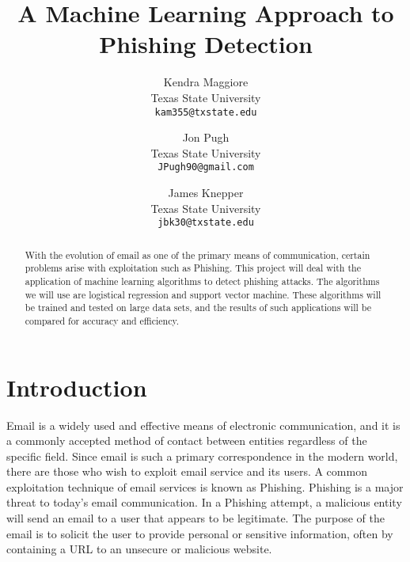 \documentclass[10pt,twocolumn,letterpaper]{article}
\begin{document}
\title{A Machine Learning Approach to Phishing Detection}

\author{Kendra Maggiore\\
Texas State University\\
{\tt\small kam355@txstate.edu}
\and
Jon Pugh\\
Texas State University\\
{\tt\small JPugh90@gmail.com}
\and
James Knepper\\
Texas State University\\
{\tt\small jbk30@txstate.edu}
}

\maketitle

\begin{abstract}
   With the evolution of email as one of the primary means of communication, certain problems arise with exploitation such as Phishing.  This project will deal with the application of machine learning algorithms to detect phishing attacks.  The algorithms we will use are logistical regression and support vector machine.  These algorithms will be trained and tested on large data sets, and the results of such applications will be compared for accuracy and efficiency.  
\end{abstract}

\section{Introduction}

Email is a widely used and effective means of electronic communication, and it is a commonly accepted method of contact between entities regardless of the specific field.  Since email is such a primary correspondence in the modern world, there are those who wish to exploit email service and its users.  A common exploitation technique of email services is known as Phishing.  Phishing is a major threat to today’s email communication.  In a Phishing attempt, a malicious entity will send an email to a user that appears to be legitimate.  The purpose of the email is to solicit the user to provide personal or sensitive information, often by containing a URL to an unsecure or malicious website.
\end{document}
